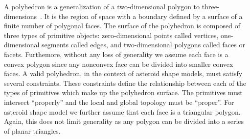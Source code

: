 A polyhedron is a generalization of a two-dimensional polygon to three-dimensions~\cite{orourke1998}.
It is the region of space with a boundary defined by a surface of a finite number of polygonal faces.
The surface of the polyhedron is composed of three types of primitive objects: zero-dimensional points called vertices, one-dimensional segments called edges, and two-dimensional polygons called faces or facets.
Furthemore, without any loss of generality we assume each face is a convex polygon since any nonconvex face can be divided into smaller convex faces.
A valid polyhedron, in the context of asteroid shape models, must satisfy several constraints.
These constraints define the relationship between each of the types of primitives which make up the polyhedron surface.
The primitives must intersect ``properly'' and the local and global topology must be ``proper''.
For asteroid shape model we further assume that each face is a triangular polygon. 
Again, this does not limit generality as any polygon can be divided into a series of planar triangles.

